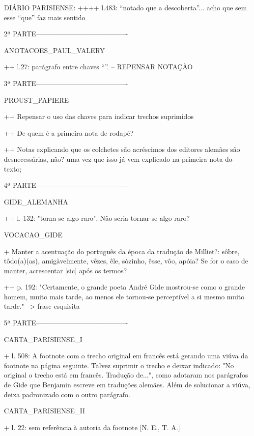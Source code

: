 DIÁRIO PARISIENSE:
++++ l.483: ``notado que a descoberta''... acho que sem esse ``que'' faz mais sentido


2ª PARTE----------------------------------------


ANOTACOES_PAUL_VALERY

++ l.27: parágrafo entre chaves ``{}''. -- REPENSAR NOTAÇÃO

3ª PARTE----------------------------------------


PROUST_PAPIERE

++ Repensar o uso das chaves para indicar trechos suprimidos

++ De quem é a primeira nota de rodapé?

++ Notas explicando que os colchetes são acréscimos dos editores alemães são desnecessárias, não? uma vez que isso já vem explicado na primeira nota do texto;

4ª PARTE----------------------------------------

GIDE_ALEMANHA

++ l. 132: "torna-se algo raro". Não seria tornar-se algo raro?


VOCACAO_GIDE

+ Manter a acentuação do português da época da tradução de Milliet?: sôbre, tôdo(a)(as), amigàvelmente, vêzes, êle, sòzinho, êsse, vôo, apóia? Se for o caso de manter, acrescentar [sic] após os termos?

++ p. 192: "Certamente, o grande poeta André Gide mostrou-se como o
grande homem, muito mais tarde, ao menos ele tornou-se
perceptível a si mesmo muito tarde." --> frase esquisita


5ª PARTE----------------------------------------

CARTA_PARISIENSE_I

+ l. 508: A footnote com o trecho original em francês está gerando uma viúva da footnote na página seguinte. Talvez suprimir o trecho e deixar indicado: "No original o trecho está em francês. Tradução de...", como adotaram nos parágrafos de Gide que Benjamin escreve em traduções alemães. Além de solucionar a viúva, deixa padronizado com o outro parágrafo.


CARTA_PARISIENSE_II

+ l. 22: sem referência à autoria da footnote [N. E., T. A.]



